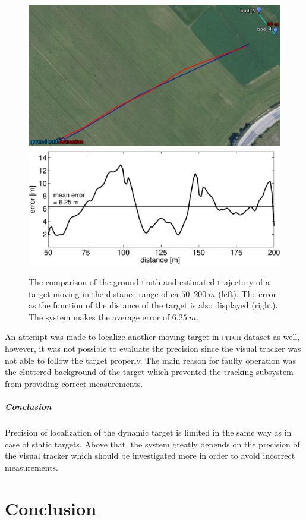 \begin{figure}[htb]\centering
	\centering
	\includegraphics[width=0.44\linewidth]{fig/eval_walking.png}
	\includegraphics[width=0.54\linewidth]{fig/eval_walking_error.pdf}
	\caption{The comparison of the ground truth and estimated trajectory of a target moving in the distance range of ca $50$--$200~m$ (left). The error as the function of the distance of the target is also displayed (right). The system makes the average error of $6.25~m$.}
	\label{fig:resultsWalking}
\end{figure}

An attempt was made to localize another moving target in \textsc{pitch} dataset as well, however, it was not possible to evaluate the precision since the visual tracker was not able to follow the target properly. The main reason for faulty operation was the cluttered background of the target which prevented the tracking subsystem from providing correct measurements.

\paragraph{Conclusion} Precision of localization of the dynamic target is limited in the same way as in case of static targets. Above that, the system greatly depends on the precision of the visual tracker which should be investigated more in order to avoid incorrect measurements.

\chapter{Conclusion} \label{txt:conclusion}

